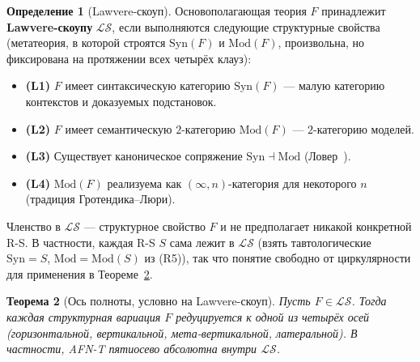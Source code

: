 \documentclass[11pt]{article}
\theoremstyle{plain}
\newtheorem{theorem}{Теорема}[section]
\theoremstyle{definition}
\newtheorem{definition}[theorem]{Определение}
\newcommand{\cS}{\mathcal{S}}
\newcommand{\cL}{\mathcal{L}}
\newcommand{\Syn}{\mathrm{Syn}}
\newcommand{\Mod}{\mathrm{Mod}}
\begin{document}
\begin{definition}[Lawvere-скоуп]\label{def:law-scope}
Основополагающая теория $F$ принадлежит \textbf{Lawvere-скоупу} $\cL\cS$, если выполняются следующие структурные свойства (метатеория, в которой строятся $\Syn(F)$ и $\Mod(F)$, произвольна, но фиксирована на протяжении всех четырёх клауз):
\begin{itemize}
\item \textbf{(L1)} $F$ имеет синтаксическую категорию $\Syn(F)$ --- малую категорию контекстов и доказуемых подстановок.
\item \textbf{(L2)} $F$ имеет семантическую $2$-категорию $\Mod(F)$ --- $2$-категорию моделей.
\item \textbf{(L3)} Существует каноническое сопряжение $\Syn \dashv \Mod$ (Ловер~\cite{Lawvere1969}).
\item \textbf{(L4)} $\Mod(F)$ реализуема как $(\infty, n)$-категория для некоторого $n$ (традиция Гротендика--Люри).
\end{itemize}
Членство в $\cL\cS$ — структурное свойство $F$ и не предполагает никакой конкретной R-S. В частности, каждая R-S $S$ сама лежит в $\cL\cS$ (взять тавтологические $\Syn = S$, $\Mod = \Mod(S)$ из (R5)), так что понятие свободно от циркулярности для применения в Теореме~\ref{thm:completeness}.
\end{definition}

\begin{theorem}[Ось полноты, условно на Lawvere-скоуп]\label{thm:completeness}
Пусть $F \in \cL\cS$. Тогда каждая структурная вариация $F$ редуцируется к одной из четырёх осей (горизонтальной, вертикальной, мета-вертикальной, латеральной). В частности, AFN-T пятиосево абсолютна внутри $\cL\cS$.
\end{theorem}
\end{document}
